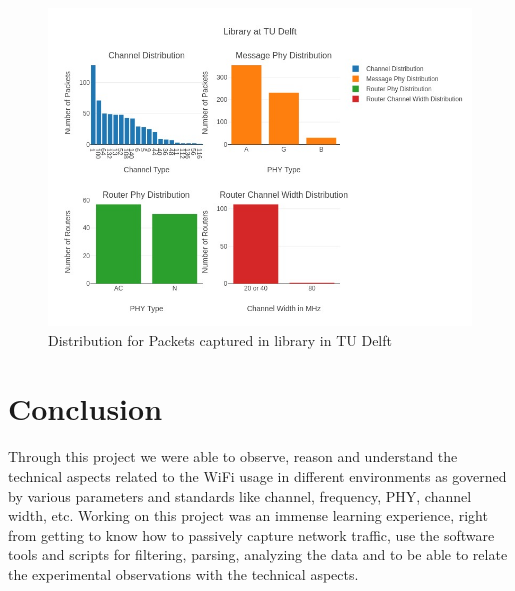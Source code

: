 \documentclass{article}
\begin{document}
\begin{figure}[h]
      	\centering
     	\includegraphics[scale=0.55]{Library at TU Delft.jpeg}
      	\caption{Distribution for Packets captured in library in TU Delft}
      	\label{Fig. 3}
\end{figure}

\section{Conclusion}

Through this project we were able to observe, reason and understand the technical aspects related to the WiFi usage in different environments as governed by various parameters and standards like channel, frequency, PHY, channel width, etc. Working on this project was an immense learning experience, right from getting to know how to passively capture network traffic, use the software tools and scripts for filtering, parsing, analyzing the data and to be able to relate the experimental observations with the technical aspects. 
\end{document}
